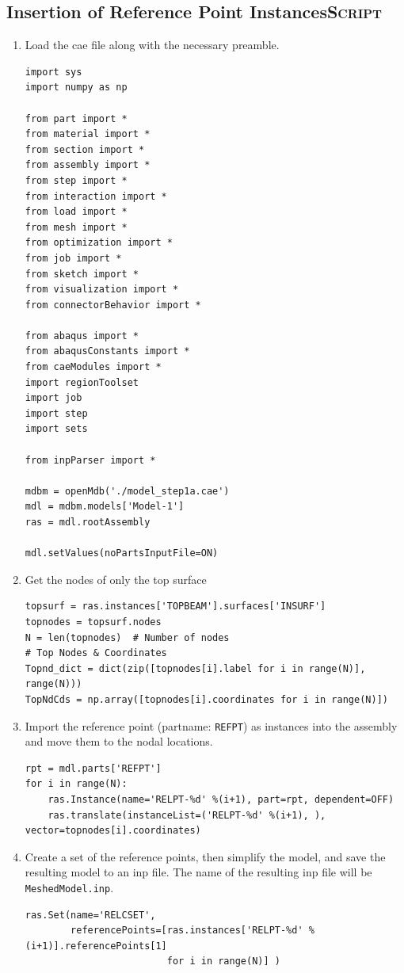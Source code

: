 \documentclass[11pt]{article}
\begin{document}
\subsection{Insertion of Reference Point Instances\hfill{}\textsc{Script}}
\label{sec:insrpt}
\begin{enumerate}
\item Load the cae file along with the necessary preamble.
\begin{verbatim}
import sys
import numpy as np

from part import *
from material import *
from section import *
from assembly import *
from step import *
from interaction import *
from load import *
from mesh import *
from optimization import *
from job import *
from sketch import *
from visualization import *
from connectorBehavior import *

from abaqus import *
from abaqusConstants import *
from caeModules import * 
import regionToolset
import job
import step
import sets

from inpParser import *

mdbm = openMdb('./model_step1a.cae')
mdl = mdbm.models['Model-1']
ras = mdl.rootAssembly

mdl.setValues(noPartsInputFile=ON)
\end{verbatim}
\item Get the nodes of only the top surface
\begin{verbatim}
topsurf = ras.instances['TOPBEAM'].surfaces['INSURF']
topnodes = topsurf.nodes
N = len(topnodes)  # Number of nodes
# Top Nodes & Coordinates
Topnd_dict = dict(zip([topnodes[i].label for i in range(N)], range(N)))
TopNdCds = np.array([topnodes[i].coordinates for i in range(N)])
\end{verbatim}
\item Import the reference point (partname: \texttt{REFPT}) as instances into the assembly and move them to the nodal locations.
\begin{verbatim}
rpt = mdl.parts['REFPT']
for i in range(N):
    ras.Instance(name='RELPT-%d' %(i+1), part=rpt, dependent=OFF)
    ras.translate(instanceList=('RELPT-%d' %(i+1), ), vector=topnodes[i].coordinates)
\end{verbatim}
\item Create a set of the reference points, then simplify the model, and save the resulting model to an inp file.
The name of the resulting inp file will be \texttt{MeshedModel.inp}.
\begin{verbatim}
ras.Set(name='RELCSET',
        referencePoints=[ras.instances['RELPT-%d' %(i+1)].referencePoints[1]
                         for i in range(N)] )


\end{verbatim}
\end{enumerate}
\end{document}
